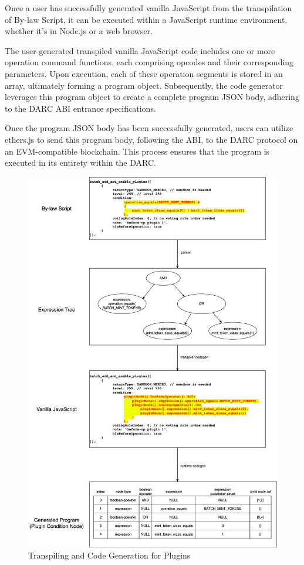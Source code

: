 \documentclass[main.tex]{subfiles}
\begin{document}
Once a user has successfully generated vanilla JavaScript from the transpilation of By-law Script, it can be executed within a JavaScript runtime environment, whether it's in Node.js or a web browser.

The user-generated transpiled vanilla JavaScript code includes one or more operation command functions, each comprising opcodes and their corresponding parameters. Upon execution, each of these operation segments is stored in an array, ultimately forming a program object. Subsequently, the code generator leverages this program object to create a complete program JSON body, adhering to the DARC ABI entrance specifications.

Once the program JSON body has been successfully generated, users can utilize ethers.js to send this program body, following the ABI, to the DARC protocol on an EVM-compatible blockchain. This process ensures that the program is executed in its entirety within the DARC.

\begin{figure}
\centering
\includegraphics[width=1\linewidth]{by-law-plugin.drawio.png}
\caption{\label{fig:by-law-plugin}Transpiling and Code Generation for Plugins}
\end{figure}
\end{document}
